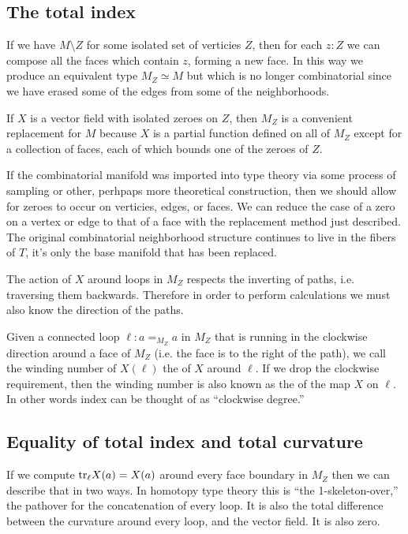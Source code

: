 \subsection{The total index}

If we have \( M\setminus Z \) for some isolated set of verticies \( Z \), then for each \( z:Z \) we can compose all the faces which contain \( z \), forming a new face. In this way we produce an equivalent type \( M_Z\simeq M \) but which is no longer combinatorial since we have erased some of the edges from some of the neighborhoods.

If \( X \) is a vector field with isolated zeroes on \( Z \), then \( M_Z \) is a convenient replacement for \( M \) because \( X \) is a partial function defined on all of \( M_Z \) except for a collection of faces, each of which bounds one of the zeroes of \( Z \).

If the combinatorial manifold was imported into type theory via some process of sampling or other, perhpaps more theoretical construction, then we should allow for zeroes to occur on verticies, edges, or faces. We can reduce the case of a zero on a vertex or edge to that of a face with the replacement method just described. The original combinatorial neighborhood structure continues to live in the fibers of \( T \), it's only the base manifold that has been replaced.

The action of \( X \) around loops in \( M_Z \) respects the inverting of paths, i.e. traversing them backwards. Therefore in order to perform calculations we must also know the direction of the paths. 

\begin{mydef}
Given a connected loop \( \ell:a=_{M_Z}a \) in \( M_Z \) that is running in the clockwise direction around a face of \( M_Z \) (i.e. the face is to the right of the path), we call the winding number of \( X(\ell) \) the  of \( X \) around \( \ell \). If we drop the clockwise requirement, then the winding number is also known as the  of the map \( X \) on \( \ell \). In other words index can be thought of as ``clockwise degree.''
\end{mydef}


\subsection{Equality of total index and total curvature}

If we compute \( \mathrm{tr}_\ell X(a)=X(a) \) around every face boundary in \( M_Z \) then we can describe that in two ways. In homotopy type theory this is ``the 1-skeleton-over,'' the pathover for the concatenation of every loop. It is also the total difference between the curvature around every loop, and the vector field. It is also zero.


